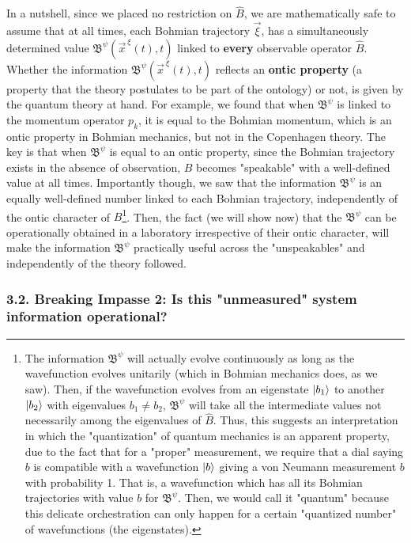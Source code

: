 \documentclass[11pt, a4paper]{article} %
\newcommand{\B}{\mathfrak{B}}
\begin{document}
In a nutshell, since we placed no restriction on $\hat{B}$, we are mathematically safe to assume that at all times, each Bohmian trajectory $\vec{\xi}$, has a simultaneously determined value $\B^\psi(\vec{x}^{\:\xi}(t),t)$ linked to {\bf every} observable operator $\hat{B}$. Whether the information $\B^\psi(\vec{x}^{\:\xi}(t),t)$ reflects an \textbf{ontic property} (a property that the theory postulates to be part of the ontology) or not, is given by the quantum theory at hand. For example, we found that when $\B^\psi$ is linked to the momentum operator ${p}_k$, it is equal to the Bohmian momentum, which is an ontic property in Bohmian mechanics, but not in the Copenhagen theory. The key is that when $\B^\psi$ is equal to an ontic property, since the Bohmian trajectory exists in the absence of observation, $B$ becomes "speakable" with a well-defined value at all times. Importantly though, we saw that the information $\B^\psi$ is an equally well-defined number linked to each Bohmian trajectory, independently of the ontic character of $B$\footnote{The information $\B^\psi$ will actually evolve continuously as long as the wavefunction evolves unitarily (which in Bohmian mechanics does, as we saw). Then, if the wavefunction evolves from an eigenstate $\ket{b_1}$ to another $\ket{b_2}$ with eigenvalues $b_1\neq b_2$, $\B^\psi$ will take all the intermediate values not necessarily among the eigenvalues of $\hat{B}$. Thus, this suggests an interpretation in which the "quantization" of quantum mechanics is an apparent property, due to the fact that for a "proper" measurement, we require that a dial saying $b$ is compatible with a wavefunction $\ket{b}$ giving a von Neumann measurement $b$ with probability 1. That is, a wavefunction which has all its Bohmian trajectories with value $b$ for $\B^\psi$. Then, we would call it "quantum" because this delicate orchestration can only happen for a certain "quantized number" of wavefunctions (the eigenstates).}. Then, the fact (we will show now) that the $\B^\psi$ can be operationally obtained in a laboratory irrespective of their ontic character, will make the information $\B^\psi$ practically useful across the "unspeakables" and independently of the theory followed.
\vspace{-0.55cm}

 
\subsubsection*{3.2. Breaking Impasse 2: Is this "unmeasured" system information operational?}\vspace{-0.15cm}
\end{document}
